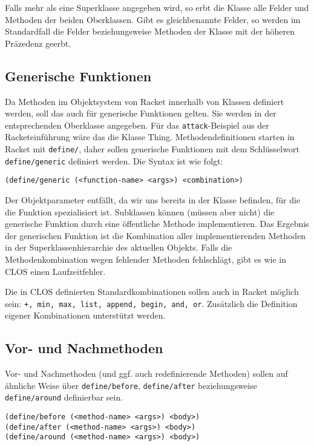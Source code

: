 Falls mehr als eine Superklasse angegeben wird, so erbt die Klasse alle Felder und Methoden der beiden Oberklassen. Gibt es gleichbenannte Felder, so werden im Standardfall die Felder beziehungsweise Methoden der Klasse mit der höheren Präzedenz geerbt.

\subsection{Generische Funktionen}
Da Methoden im Objektsystem von Racket innerhalb von Klassen definiert werden, soll das auch für generische Funktionen gelten. Sie werden in der entsprechenden Oberklasse angegeben. Für das \texttt{attack}-Beispiel aus der Racketeinführung wäre das die Klasse Thing. Methodendefinitionen starten in Racket mit \texttt{define/}, daher sollen generische Funktionen mit dem Schlüsselwort \texttt{define/generic} definiert werden. Die Syntax ist wie folgt:

\texttt{(define/generic ({\textless}function-name{\textgreater} {\textless}args{\textgreater}) {\textless}combination{\textgreater})}

Der Objektparameter entfällt, da wir uns bereits in der Klasse befinden, für die die Funktion spezialisiert ist. Subklassen können (müssen aber nicht) die generische Funktion durch eine öffentliche Methode implementieren. Das Ergebnis der generischen Funktion ist die Kombination aller implementierenden Methoden in der Superklassenhierarchie des aktuellen Objekts. Falls die Methodenkombination wegen fehlender Methoden fehlschlägt, gibt es wie in CLOS einen Laufzeitfehler.

Die in CLOS definierten Standardkombinationen sollen auch in Racket möglich sein: \texttt{+, min, max, list, append, begin, and, or}. 
Zusätzlich die Definition eigener Kombinationen unterstützt werden.


\subsection{Vor- und Nachmethoden}
Vor- und Nachmethoden (und ggf. auch redefinierende Methoden) sollen auf ähnliche Weise über \texttt{define/before}, \texttt{define/after} beziehungsweise \texttt{define/around} definierbar sein. 

\texttt{(define/before ({\textless}method-name{\textgreater} {\textless}args{\textgreater}) {\textless}body{\textgreater})}\\
\texttt{(define/after ({\textless}method-name{\textgreater} {\textless}args{\textgreater}) {\textless}body{\textgreater})}\\
\texttt{(define/around ({\textless}method-name{\textgreater} {\textless}args{\textgreater}) {\textless}body{\textgreater})}

